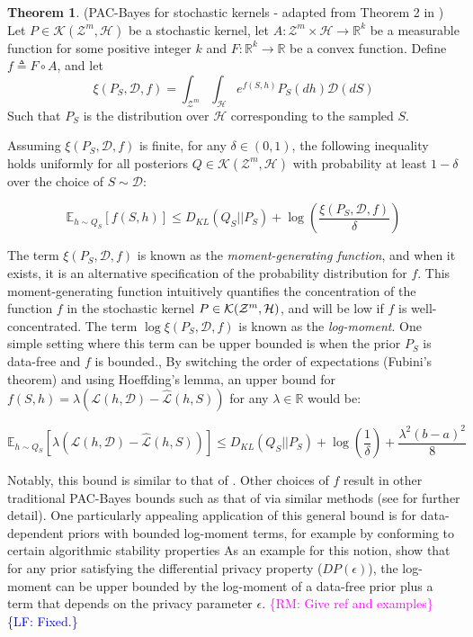 \documentclass{article}
\theoremstyle{definition}
\newtheorem{theorem}{Theorem}[section]
\newcommand{\Expect}[2]{\mathbb{E}_{#1}\left [#2 \right ]}
\newcommand{\RM}[1]{\textcolor{magenta}{\{RM: #1\}}}
\newcommand{\LF}[1]{\textcolor{blue}{\{LF: #1\}}}
\begin{document}
\begin{theorem} (PAC-Bayes for stochastic kernels - adapted from Theorem 2 in \citet{Rivasplata2020}) \label{thm:rivasplata-pb}
	Let $P\in \mathcal{K}(\mathcal{Z}^m, \mathcal{H})$ be a stochastic kernel, let $A: \mathcal{Z}^m\times \mathcal{H}\rightarrow \mathbb{R}^k$ be a measurable function for some positive integer $k$ and $F:\mathbb{R}^k\rightarrow \mathbb{R}$ be a convex function.
	Define $f\triangleq F\circ A$, and let 
	$$\xi(P_S, \mathcal{D}, f)=\int_{\mathcal{Z}^m}\int_{\mathcal{H}}e^{f(S, h)}P_S(dh)\mathcal{D}(dS)$$
	Such that $P_S$ is the distribution over $\mathcal{H}$ corresponding to the sampled $S$.
	
	Assuming $\xi(P_S, \mathcal{D}, f)$ is finite, for any $\delta \in (0,1)$, the following inequality holds uniformly for all posteriors $Q\in \mathcal{K}(\mathcal{Z}^m, \mathcal{H})$ with probability at least $1-\delta$ over the choice of $S\sim \mathcal{D}$:
	
	\begin{equation} \label{eq:ribasplata-pb}
	\Expect{h\sim Q_S}{f(S, h)} \leq D_{KL}(Q_S||P_S)+\log\left (\frac{\xi(P_S, \mathcal{D}, f)}{\delta}\right )
	\end{equation}
\end{theorem}

The term $\xi(P_S, \mathcal{D}, f)$ is known as the \emph{moment-generating function}, and when it exists, it is an alternative specification of the probability distribution for $f$.
This moment-generating function intuitively quantifies the concentration of the function $f$ in the stochastic kernel $P\in{\cal K}({\cal Z}^m,{\cal H})$, and will be low if $f$ is well-concentrated.
The term $\log\xi(P_S, \mathcal{D}, f)$ is known as the \emph{log-moment}. 
One simple setting where this term can be upper bounded is when the prior $P_S$ is data-free and $f$ is bounded., By switching the order of expectations (Fubini's theorem) and using Hoeffding's lemma, an upper bound for $f(S,h)=\lambda(\mathcal{L}(h,\mathcal{D})-\hat{\mathcal{L}}(h, S))$ for any $\lambda\in \mathbb{R}$ would be:

$$\Expect{h\sim Q_S}{\lambda(\mathcal{L}(h,\mathcal{D})-\hat{\mathcal{L}}(h, S))} \leq D_{KL}(Q_S||P_S)+\log\left (\frac{1}{\delta}\right ) + \frac{\lambda^2(b-a)^2}{8}$$

Notably, this bound is similar to that of \citet{Catoni2004}. Other choices of $f$ result in other traditional PAC-Bayes bounds such as that of \citet{Mcallester} via similar methods (see \citet{Rivasplata2020} for further detail). 
One particularly appealing application of this general bound is for data-dependent priors with bounded log-moment terms, for example by conforming to certain algorithmic stability properties 
As an example for this notion, \citet{Rivasplata2020} show that for any prior satisfying the differential privacy property ($DP(\epsilon)$), the log-moment can be upper bounded by the log-moment of a data-free prior plus a term that depends on the privacy parameter $\epsilon$. \RM{Give ref and examples} \LF{Fixed.}
\end{document}
